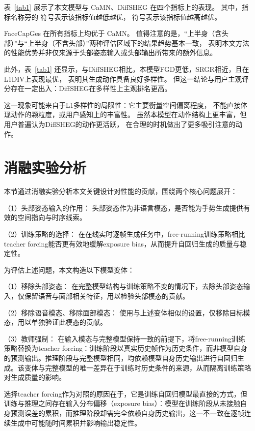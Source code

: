 表~\ref{tab1} 展示了本文模型与 CaMN、DiffSHEG 在四个指标上的表现。
其中，指标名称旁的 \textdownarrow 符号表示该指标值越低越优，
\textuparrow 符号表示该指标值越高越优。

FaceCapGes 在所有指标上均优于 CaMN。
值得注意的是，“上半身（含头部）”与“上半身（不含头部）”两种评估区域下的结果趋势基本一致，
表明本文方法的性能优势并非仅来源于头部姿态输入或头部输出所带来的额外信息。


此外，表~\ref{tab1} 还显示，与DiffSHEG相比，本模型FGD更低，SRGR相近，且在L1DIV上表现最优，
表明其生成动作具备良好多样性。
但这一结论与用户主观评分存在一定出入：DiffSHEG在多样性上主观排名更高。

这一现象可能来自于L1多样性的局限性：它主要衡量空间偏离程度，
不能直接体现动作的颗粒度，或用户感知上的丰富性。
虽然本模型在动作结构上更丰富，但用户普遍认为DiffSHEG的动作更活跃，
在合理的时机做出了更多吸引注意的动作。

\section{消融实验分析}
\label{subsec:ablation}

本节通过消融实验分析本文关键设计对性能的贡献，围绕两个核心问题展开：

（1）头部姿态输入的作用：
头部姿态作为非语言模态，是否能为手势生成提供有效的空间指向与时序线索。

（2）训练策略的选择：
在在线实时逐帧生成任务中，free-running训练策略相比teacher forcing能否更有效地缓解exposure bias，从而提升自回归生成的质量与稳定性。

为评估上述问题，本文构造以下模型变体：

（1）移除头部姿态：
在完整模型结构与训练策略不变的情况下，去除头部姿态输入，仅保留语音与面部相关特征，用以检验头部模态的贡献。

（2）移除语音模态、移除面部模态：
使用与上述变体相似的设置，仅移除目标模态，用以单独验证此模态的贡献。

（3）教师强制：
在输入模态与完整模型保持一致的前提下，将free-running训练策略替换为teacher forcing：训练阶段以真实历史帧作为历史条件，而非模型自身的预测输出。推理阶段与完整模型相同，均依赖模型自身历史输出进行自回归生成。该变体与完整模型的唯一差异在于训练时历史条件的来源，从而隔离训练策略对生成质量的影响。

选择teacher forcing作为对照的原因在于，它是训练自回归模型最直接的方式，但训练与推理之间存在输入分布偏移（exposure bias）：模型在训练阶段从未接触自身预测误差的累积，而推理阶段却需完全依赖自身历史输出，这一不一致在逐帧连续生成中可能随时间累积并影响输出稳定性。

